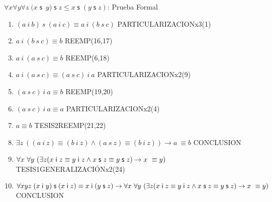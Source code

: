 \documentclass[10pt]{beamer}
\newcounter{saveenumi}
\newcommand{\seti}{\setcounter{saveenumi}{\value{enumi}}}
\newcommand{\conti}{\setcounter{enumi}{\value{saveenumi}}}
\newcommand{\Cfontd}{\fontsize{5.5}{9.5}\selectfont}
\newcommand{\Nand}{\wedge}
\newcommand{\Nrefl}{{A}_{\leq R}}
\newcommand{\Nanti}{{A}_{\leq A}}
\newcommand{\Ntrans}{{A}_{\leq T}}
\newcommand{\NsCot}{{A}_{\mathsf{s}esC}}
\newcommand{\NsLesCot}{{A}_{\mathsf{s}\leq C}}
\newcommand{\assoc}{\forall x\forall y\forall
z\;(x\;\mathsf{s}$\ $y)\;\mathsf{s}\;z\leq x\;\mathsf{s}\;(y\;\mathsf{s}\;z)}
\newcommand{\idistr}{\forall xyz\;(x\;\mathsf{i}\
y)\;\mathsf{s}\;(x\;\mathsf{i}\;z)\equiv x\;\mathsf{i}\;(y\;\mathsf{s}%
\;z)}
\newcommand{\myconj}{x\;\mathsf{i}\;z\equiv y\;\mathsf{%
i}\;z\wedge x\;\mathsf{s}\;z\equiv y\;\mathsf{s}\;z}
\begin{document}
\begin{frame}{$\assoc$: Prueba Formal}

\Cfontd
\begin{enumerate}[<+->]
  \conti
  \item $ (a\ i\ b)\ s\ (a\ i\ c) \equiv a\ i\ (b\ s\ c)$ \hfill PARTICULARIZACIONx3(1)
  \item $ a\ i\ (b\ s\ c) \equiv b $ \hfill REEMP(16,17)
  \item $ a\ i\ (a\ s\ c) \equiv b $ \hfill REEMP(6,18)
  \item $a\ i\ (a\ s\ c) \equiv (a\ s\ c)\ i\ a $ \hfill PARTICULARIZACIONx2(9)

  \item $ (a\ s\ c)\ i\ a \equiv b$ \hfill REEMP(19,20)
  \item $ (a\ s\ c)\ i\ a \equiv a$ \hfill PARTICULARIZACIONx2(4)
  \item $ a \equiv b$ \hfill TESIS2REEMP(21,22)
  \item $ \exists z\ ((a\ i\ z) \equiv (b\ i\ z) \Nand (a\ s\ z) \equiv (b\ i\ z)) \rightarrow a\ \equiv b$ \hfill CONCLUSION
  \item $ \forall x\ \forall y\ (\exists z (\myconj) \rightarrow x\ \equiv y)$ \hfill TESIS1GENERALIZACIÓNx2(24)
  \item $ \idistr \rightarrow \forall x\ \forall y\ (\exists z (\myconj) \rightarrow x\ \equiv y)$ \hfill CONCLUSION
  \seti
\end{enumerate}

\end{frame}



%
\end{document}
